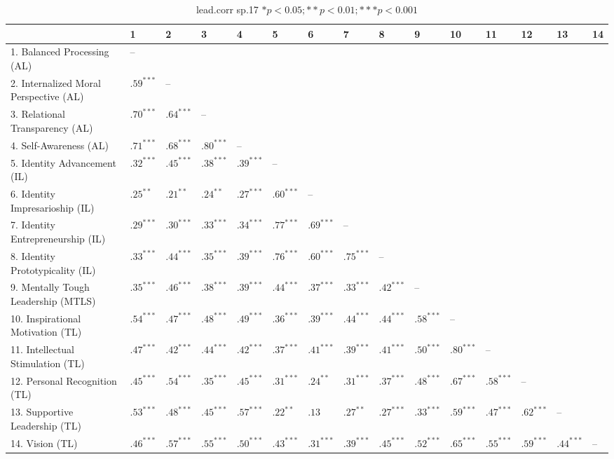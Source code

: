\begin{table}[ht]
\centering
\begin{tabular}{lllllllllllllll}
  \hline
 & 1 & 2 & 3 & 4 & 5 & 6 & 7 & 8 & 9 & 10 & 11 & 12 & 13 & 14 \\ 
  \hline
1. Balanced Processing (AL) & -- &  &  &  &  &  &  &  &  &  &  &  &  &  \\ 
  2. Internalized Moral Perspective (AL) & $.59^{***}$ & -- &  &  &  &  &  &  &  &  &  &  &  &  \\ 
  3. Relational Transparency (AL) & $.70^{***}$ & $.64^{***}$ & -- &  &  &  &  &  &  &  &  &  &  &  \\ 
  4. Self-Awareness (AL) & $.71^{***}$ & $.68^{***}$ & $.80^{***}$ & -- &  &  &  &  &  &  &  &  &  &  \\ 
  5. Identity Advancement (IL) & $.32^{***}$ & $.45^{***}$ & $.38^{***}$ & $.39^{***}$ & -- &  &  &  &  &  &  &  &  &  \\ 
  6. Identity Impresarioship (IL) & $.25^{**}$ & $.21^{**}$ & $.24^{**}$ & $.27^{***}$ & $.60^{***}$ & -- &  &  &  &  &  &  &  &  \\ 
  7. Identity Entrepreneurship (IL) & $.29^{***}$ & $.30^{***}$ & $.33^{***}$ & $.34^{***}$ & $.77^{***}$ & $.69^{***}$ & -- &  &  &  &  &  &  &  \\ 
  8. Identity Prototypicality (IL) & $.33^{***}$ & $.44^{***}$ & $.35^{***}$ & $.39^{***}$ & $.76^{***}$ & $.60^{***}$ & $.75^{***}$ & -- &  &  &  &  &  &  \\ 
  9. Mentally Tough Leadership (MTLS) & $.35^{***}$ & $.46^{***}$ & $.38^{***}$ & $.39^{***}$ & $.44^{***}$ & $.37^{***}$ & $.33^{***}$ & $.42^{***}$ & -- &  &  &  &  &  \\ 
  10. Inspirational Motivation (TL) & $.54^{***}$ & $.47^{***}$ & $.48^{***}$ & $.49^{***}$ & $.36^{***}$ & $.39^{***}$ & $.44^{***}$ & $.44^{***}$ & $.58^{***}$ & -- &  &  &  &  \\ 
  11. Intellectual Stimulation (TL) & $.47^{***}$ & $.42^{***}$ & $.44^{***}$ & $.42^{***}$ & $.37^{***}$ & $.41^{***}$ & $.39^{***}$ & $.41^{***}$ & $.50^{***}$ & $.80^{***}$ & -- &  &  &  \\ 
  12. Personal Recognition (TL) & $.45^{***}$ & $.54^{***}$ & $.35^{***}$ & $.45^{***}$ & $.31^{***}$ & $.24^{**}$ & $.31^{***}$ & $.37^{***}$ & $.48^{***}$ & $.67^{***}$ & $.58^{***}$ & -- &  &  \\ 
  13. Supportive Leadership (TL) & $.53^{***}$ & $.48^{***}$ & $.45^{***}$ & $.57^{***}$ & $.22^{**}$ & $.13$ & $.27^{**}$ & $.27^{***}$ & $.33^{***}$ & $.59^{***}$ & $.47^{***}$ & $.62^{***}$ & -- &  \\ 
  14. Vision (TL) & $.46^{***}$ & $.57^{***}$ & $.55^{***}$ & $.50^{***}$ & $.43^{***}$ & $.31^{***}$ & $.39^{***}$ & $.45^{***}$ & $.52^{***}$ & $.65^{***}$ & $.55^{***}$ & $.59^{***}$ & $.44^{***}$ & -- \\ 
   \hline
\end{tabular}
\caption{lead.corr sp.17 $* p < 0.05; ** p < 0.01; *** p < 0.001$} 
\label{freq_corr.lead.corr.sp.17}
\end{table}
